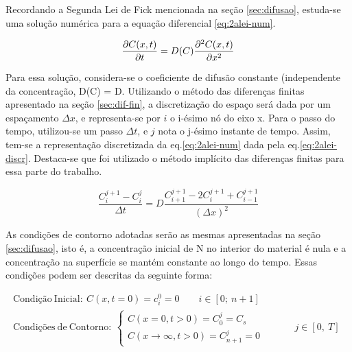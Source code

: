 Recordando a Segunda Lei de Fick mencionada na seção \ref{sec:difusao}, estuda-se uma solução numérica para a equação diferencial \ref{eq:2alei-num}.

\begin{equation}
\label{eq:2alei-num}
\pdv{C(x,t)}{t} = D(C)\pdv[2]{C(x,t)}{x}
\end{equation}

Para essa solução, considera-se o coeficiente de difusão constante (independente da concentração, D(C) = D. Utilizando o método das diferenças finitas apresentado na seção \ref{sec:dif-fin}, a discretização do espaço será dada por um espaçamento {$\Delta x$}, e representa-se por $i$ o i-ésimo nó do eixo x. Para o passo do tempo, utilizou-se um passo {$\Delta t$}, e $j$ nota o j-ésimo instante de tempo. Assim, tem-se a representação discretizada da eq.\ref{eq:2alei-num} dada pela eq.\ref{eq:2alei-discr}. Destaca-se que foi utilizado o método implícito das diferenças finitas para essa parte do trabalho.

\begin{equation}
\label{eq:2alei-discr}
\dfrac{C_i^{j+1} - C_i^j}{\Delta t} = D\dfrac{C_{i+1}^{j+1} - 2C_i^{j+1} + C_{i-1}^{j+1}}{(\Delta x)^2}
\end{equation}



As condições de contorno adotadas serão as mesmas apresentadas na seção \ref{sec:difusao}, isto é, a concentração inicial de N no interior do material é nula e a concentração na superfície se mantém constante ao longo do tempo. Essas condições podem ser descritas da seguinte forma:

\begin{gather*}
		\mathrm{Condição\ Inicial: }\ C(x, t=0) = c_i^0 = 0 \qquad i \in [0;\ n+1] \\
		\mathrm{Condições\ de\ Contorno:}\ 
		\left\{
    		\begin{array}{l}
      			C(x=0, t>0) = C_0^j = C_s  \\
				C(x\rightarrow\infty, t>0) = C_{n+1}^j = 0 
			\end{array}
    		\begin{array}{l}
      		\qquad \\
			\qquad \\	   
    		\end{array}
    		\begin{array}{l}
    			j \in [0,\ T] 
    		\end{array}
		\right.	
\end{gather*}


